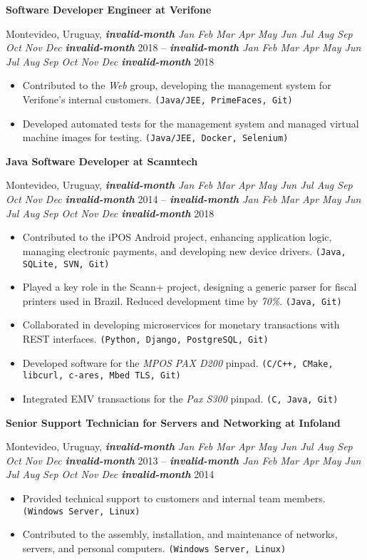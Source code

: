 \documentclass[a4paper]{article}
\newcommand{\invalidmonth}{\emph{\textbf{invalid-month}}}
\newcommand{\cvmonth}[1]{
  \ifcase#1 \invalidmonth
    \or Jan
    \or Feb
    \or Mar
    \or Apr
    \or May
    \or Jun
    \or Jul
    \or Aug
    \or Sep
    \or Oct
    \or Nov
    \or Dec
  \else
    \invalidmonth
  \fi
}
\newcommand{\cvdate}[2]{
  \emph{\cvmonth{#1}} {#2}
}
\newcommand{\cvposition}[2]{
  \noindent\textbf{#1 at #2}\par
}
\newcommand{\cvlocation}[3]{
  \noindent #1, #2 -- #3\par
}
\newenvironment{cvexperience}{
  \noindent{\large\textbf{Work Experience:}}
  \medskip
}{
  \bigskip
}
\newenvironment{cvjob}{
  \begin{sloppypar}
}{
  \end{sloppypar}
  \bigskip
}
\newcommand{\cvskills}[1]{\texttt{(#1)}}
\begin{document}
\begin{cvexperience}
\begin{cvjob}
  \cvposition{Software Developer Engineer}{Verifone}
  \cvlocation{Montevideo, Uruguay}{\cvdate{5}{2018}}{\cvdate{11}{2018}}
  \begin{itemize}
    \item Contributed to the \emph{Web} group, developing the management system for Verifone's internal customers. \cvskills{Java/JEE, PrimeFaces, Git}
    \item Developed automated tests for the management system and managed virtual machine images for testing. \cvskills{Java/JEE, Docker, Selenium}
  \end{itemize}
\end{cvjob}


\begin{cvjob}
  \cvposition{Java Software Developer}{Scanntech}
  \cvlocation{Montevideo, Uruguay}{\cvdate{8}{2014}}{\cvdate{4}{2018}}
  \begin{itemize}
    \item Contributed to the iPOS Android project, enhancing application logic, managing electronic payments, 
    and developing new device drivers. \cvskills{Java, SQLite, SVN, Git}
    \item Played a key role in the Scann+ project, designing a generic parser for fiscal printers used in Brazil. 
    Reduced development time by \emph{70\%}. \cvskills{Java, Git}
    \item Collaborated in developing microservices for monetary transactions with REST interfaces. 
    \cvskills{Python, Django, PostgreSQL, Git}
    \item Developed software for the \emph{MPOS PAX D200} pinpad. \cvskills{C/C++, CMake, libcurl, c-ares, Mbed TLS, Git}
    \item Integrated EMV transactions for the \emph{Pax S300} pinpad. \cvskills{C, Java, Git}
  \end{itemize}
\end{cvjob}

\begin{cvjob}
  \cvposition{Senior Support Technician for Servers and Networking}{Infoland}
  \cvlocation{Montevideo, Uruguay}{\cvdate{11}{2013}}{\cvdate{7}{2014}}
  
  \begin{itemize}
    \item Provided technical support to customers and internal team members. \cvskills{Windows Server, Linux}
    \item Contributed to the assembly, installation, and maintenance of networks, servers, and personal computers. \cvskills{Windows Server, Linux}
  \end{itemize}
\end{cvjob}


\end{cvexperience}
\end{document}
